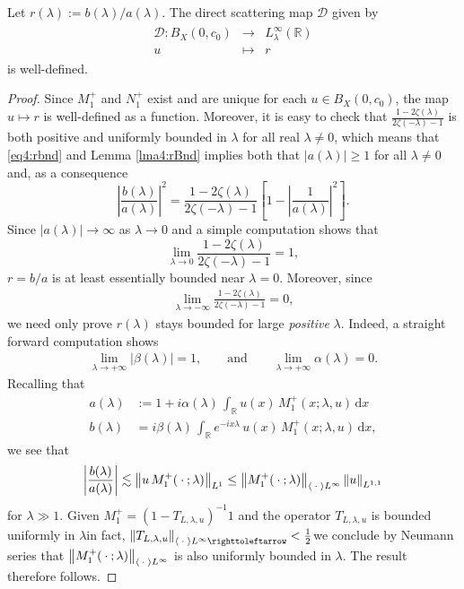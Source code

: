 \documentclass[../dissertation.tex]{subfiles}
\begin{document}
\begin{thm}\label{thm4:Dwelldefined}
	Let $r(\lambda) := b(\lambda) / a(\lambda)$. The direct scattering map
	$\mathscr D$ given by 
	\begin{align*}
		\begin{array}{rcl}
			\mathscr D: B_X(0, c_0) &\to& L_\lambda^\infty(\mathbb R)  \\
			            u           &\mapsto& r
		\end{array}
	\end{align*}
	is well-defined.
\end{thm}
\begin{proof}
	Since $M_1^+$ and $N_1^+$ exist and are unique for each $u \in B_X(0, c_0)$, the 
	map $u \mapsto r$ is well-defined as a function. Moreover, it is easy to check 
	that $\frac{1-2\zeta(\lambda)}{2\zeta(-\lambda)-1}$ is both positive and uniformly
	bounded in $\lambda$ for all real $\lambda \ne 0$, which means that \eqref{eq4:rbnd} and Lemma 
	\ref{lma4:rBnd} implies both that $|a(\lambda)| \geq 1$ for all 
	$\lambda \ne 0$ and, as a consequence
	\[
		\left| \frac{b(\lambda)}{a(\lambda)} \right|^2
			= 
				\frac{1-2\zeta(\lambda)}{2\zeta(-\lambda)-1} 
				\left[
					1 - \left|\frac{1}{a(\lambda)}\right|^2 
				\right].
	\]
	Since $|a(\lambda)| \to \infty$ as $\lambda \to 0$ and a simple computation shows that
	\[
		\lim_{\lambda \to 0} \frac{1-2\zeta(\lambda)}{2\zeta(-\lambda)-1} 
			= 1,
	\]
	$r = b/a$ is at least essentially bounded near $\lambda = 0$. Moreover, 
	since
	\begin{align}
		\label{eq4:rNegLamLimit}
		\lim_{\lambda\to-\infty}\frac{1-2\zeta(\lambda)}{2\zeta(-\lambda)-1}
			= 0,
	\end{align}
	we need only prove $r(\lambda)$ stays bounded for large \textit{positive} 
	$\lambda$. Indeed, a straight forward computation shows
	\begin{align}\label{eq4:reslimits}
		\lim_{\lambda\to+\infty} |\beta(\lambda)| = 1,
		\qquad \text{and} \qquad
		\lim_{\lambda\to+\infty} \alpha(\lambda) = 0.
	\end{align}
	Recalling that
	\begin{align*}
		a(\lambda)
				&:= 1 + i \alpha(\lambda) \,
					\int_{\mathbb R} u(x) \, M_1^+(x; \lambda, u) \, \mathrm{d}x \\
			b(\lambda)
				&= i \beta(\lambda) \, 
					\int_{\mathbb R} 
						e^{-ix\lambda} \, u(x) \, M_1^+(x; \lambda, u) 
					\, \mathrm{d}x,
	\end{align*}
	we see that
	\[
		\left|\frac{b(\lambda)}{a(\lambda)}\right|
			\lesssim \left\| u\,M_1^+(\kern 0.5ex \cdot \kern 0.5ex; \lambda) \right\|_{L^1}
			\leq 
				\left\| M_1^+(\kern 0.5ex \cdot \kern 0.5ex; \lambda) \right\|_{\left\langle \kern 0.5ex \cdot \kern 0.5ex \right\rangle L^\infty} 
				\left\| u \right\|_{L^{1,1}}
	\]
	for $\lambda \gg 1$. Given $M_1^+ = \left(1 - T_{L, \lambda, u} \right)^{-1} 1$
	and the operator $T_{L, \lambda, u}$ is bounded uniformly in 
	$\lambda$\textemdash{}in fact, 
	$\nm{T_{L, \lambda, u}}_{\inn{\dotarg}L^\infty\toitself}
	<\frac{1}{2}$\textemdash{}we conclude by Neumann series that 
	$\left\| M_1^+(\kern 0.5ex \cdot \kern 0.5ex; \lambda) \right\|_{\left\langle \kern 0.5ex \cdot \kern 0.5ex \right\rangle L^\infty}$ is also uniformly 
	bounded in $\lambda$. The result therefore follows.
\end{proof}
\end{document}
